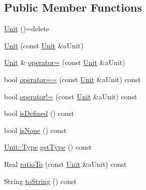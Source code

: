 \subsection*{Public Member Functions}
\begin{DoxyCompactItemize}
\item 
\hyperlink{classostk_1_1physics_1_1_unit_abb6ab5ed9dcc07c65af5bb594e5f87f0}{Unit} ()=delete
\item 
\hyperlink{classostk_1_1physics_1_1_unit_aaa79239cad3b8499ce9dc4ebec2b8f05}{Unit} (const \hyperlink{classostk_1_1physics_1_1_unit}{Unit} \&a\+Unit)
\item 
\hyperlink{classostk_1_1physics_1_1_unit}{Unit} \& \hyperlink{classostk_1_1physics_1_1_unit_a1ca37a2c58beea2b837504356ac9a312}{operator=} (const \hyperlink{classostk_1_1physics_1_1_unit}{Unit} \&a\+Unit)
\item 
bool \hyperlink{classostk_1_1physics_1_1_unit_a2f402b7601cef9914f8c367e44f9886c}{operator==} (const \hyperlink{classostk_1_1physics_1_1_unit}{Unit} \&a\+Unit) const
\item 
bool \hyperlink{classostk_1_1physics_1_1_unit_ab99c2e4afec3e69ba573528dd9f3f9ac}{operator!=} (const \hyperlink{classostk_1_1physics_1_1_unit}{Unit} \&a\+Unit) const
\item 
bool \hyperlink{classostk_1_1physics_1_1_unit_a94e73e5bae82b568280fd3055702dac8}{is\+Defined} () const
\item 
bool \hyperlink{classostk_1_1physics_1_1_unit_a300c6c5aac22fa2badf2b8a480d770f8}{is\+None} () const
\item 
\hyperlink{classostk_1_1physics_1_1_unit_a1c07d36cd02be8541eb972367e2b628f}{Unit\+::\+Type} \hyperlink{classostk_1_1physics_1_1_unit_ad7cf872fcf44faaa79b4f59855060f89}{get\+Type} () const
\item 
Real \hyperlink{classostk_1_1physics_1_1_unit_a6c88c955a56b590f4623e8a1fa2a9cbb}{ratio\+To} (const \hyperlink{classostk_1_1physics_1_1_unit}{Unit} \&a\+Unit) const
\item 
String \hyperlink{classostk_1_1physics_1_1_unit_a496115fe0905a2a26b6f742382f3b7f0}{to\+String} () const
\end{DoxyCompactItemize}
